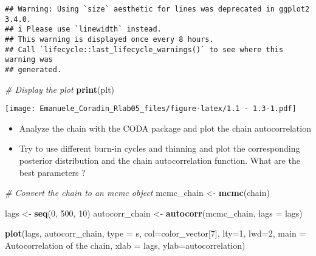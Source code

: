 \documentclass[
]{article}
\newenvironment{Shaded}{\begin{snugshade}}{\end{snugshade}}
\newcommand{\AttributeTok}[1]{\textcolor[rgb]{0.13,0.29,0.53}{#1}}
\newcommand{\CommentTok}[1]{\textcolor[rgb]{0.56,0.35,0.01}{\textit{#1}}}
\newcommand{\DecValTok}[1]{\textcolor[rgb]{0.00,0.00,0.81}{#1}}
\newcommand{\FunctionTok}[1]{\textcolor[rgb]{0.13,0.29,0.53}{\textbf{#1}}}
\newcommand{\NormalTok}[1]{#1}
\newcommand{\OtherTok}[1]{\textcolor[rgb]{0.56,0.35,0.01}{#1}}
\newcommand{\StringTok}[1]{\textcolor[rgb]{0.31,0.60,0.02}{#1}}
\begin{document}
\begin{verbatim}
## Warning: Using `size` aesthetic for lines was deprecated in ggplot2 3.4.0.
## i Please use `linewidth` instead.
## This warning is displayed once every 8 hours.
## Call `lifecycle::last_lifecycle_warnings()` to see where this warning was
## generated.
\end{verbatim}

\begin{Shaded}
\begin{Highlighting}[]
\CommentTok{\# Display the plot}
\FunctionTok{print}\NormalTok{(plt)}
\end{Highlighting}
\end{Shaded}

\texttt{[image: Emanuele\_Coradin\_Rlab05\_files/figure-latex/1.1 - 1.3-1.pdf]}

\begin{itemize}
\item
  Analyze the chain with the CODA package and plot the chain
  autocorrelation
\item
  Try to use different burn-in cycles and thinning and plot the
  corresponding posterior distribution and the chain autocorrelation
  function. What are the best parameters ?
\end{itemize}

\begin{Shaded}
\begin{Highlighting}[]
\CommentTok{\# Convert the chain to an mcmc object}
\NormalTok{mcmc\_chain }\OtherTok{\textless{}{-}} \FunctionTok{mcmc}\NormalTok{(chain)}

\NormalTok{lags }\OtherTok{\textless{}{-}} \FunctionTok{seq}\NormalTok{(}\DecValTok{0}\NormalTok{, }\DecValTok{500}\NormalTok{, }\DecValTok{10}\NormalTok{)}
\NormalTok{autocorr\_chain }\OtherTok{\textless{}{-}} \FunctionTok{autocorr}\NormalTok{(mcmc\_chain, }\AttributeTok{lags =}\NormalTok{ lags)}

\FunctionTok{plot}\NormalTok{(lags, autocorr\_chain, }\AttributeTok{type =} \StringTok{\textquotesingle{}s\textquotesingle{}}\NormalTok{, }\AttributeTok{col=}\NormalTok{color\_vector[}\DecValTok{7}\NormalTok{], }\AttributeTok{lty=}\DecValTok{1}\NormalTok{, }\AttributeTok{lwd=}\DecValTok{2}\NormalTok{, }\AttributeTok{main =} \StringTok{\textquotesingle{}Autocorrelation of the chain\textquotesingle{}}\NormalTok{, }\AttributeTok{xlab =} \StringTok{\textquotesingle{}lags\textquotesingle{}}\NormalTok{, }\AttributeTok{ylab=}\StringTok{\textquotesingle{}autocorrelation\textquotesingle{}}\NormalTok{)}
\end{Highlighting}
\end{Shaded}
\end{document}
